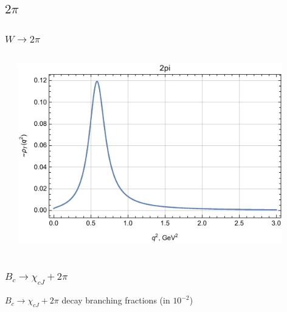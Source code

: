 \documentclass{beamer}
\begin{document}
\subsection{$2\pi$}
\begin{frame}
  \frametitle{$W \to  2\pi$}
  \begin{columns}
    \begin{column}{0.5\textwidth}
    \end{column}
    \begin{column}{0.5\textwidth}
  \includegraphics[width=0.9\textwidth]{figs/rhoT_2pi_q2}
    \end{column}
  \end{columns}
\end{frame}

\begin{frame}
  \frametitle{$B_c \to \chi_{cJ} + 2\pi$}

  $B_c \to \chi_{cJ} + 2\pi$ decay branching fractions (in $10^{-2}$) 

  
\end{frame}
\end{document}
